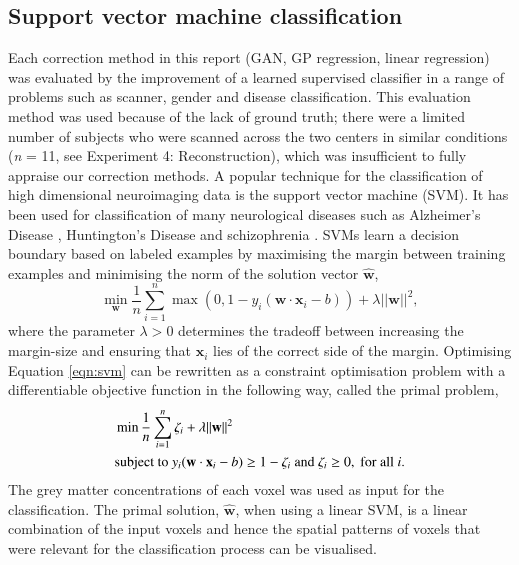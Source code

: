 \subsection{Support vector machine classification}
Each correction method in this report (GAN, GP regression, linear regression) was evaluated by the improvement of a learned supervised classifier in a range of problems such as scanner, gender and disease classification. This evaluation method was used because of the lack of ground truth; there were a limited number of subjects who were scanned across the two centers in similar conditions (\textit{n} = 11, see Experiment 4: Reconstruction), which was insufficient to fully appraise our correction methods. A popular technique for the classification of high dimensional neuroimaging data is the support vector machine (SVM). It has been used for classification of many neurological diseases such as Alzheimer's Disease \citep{magnin2009support, jongkreangkrai2016computer}, Huntington's Disease \citep{kostro2014correction} and schizophrenia \citep{winterburn2017can,davatzikos2005whole,koutsouleris2009use,zhang2014heterogeneity,kambeitz2015detecting}. SVMs learn a decision boundary based on labeled examples by maximising the margin between training examples and minimising the norm of the solution vector $\hat{\mathbf{w}}$,
\begin{equation}
	\min_\mathbf{w} \frac{1}{n}\sum_{i=1}^n \max (0,1-y_i(\mathbf{w}\cdot \mathbf{x}_i -b)) + \lambda ||\mathbf{w}||^2 ,
    \label{eqn:svm}
\end{equation}
where the parameter $\lambda>0$ determines the tradeoff between increasing the margin-size and ensuring that $\mathbf{x}_i$ lies of the correct side of the margin.
Optimising Equation \ref{eqn:svm} can be rewritten as a constraint optimisation problem with a differentiable objective function in the following way, called the primal problem,
\begin{align}
 \nonumber &\min \frac{1}{n}\sum_{i=1}^n \zeta_i +\lambda ||\mathbf{w}||^2 \\
 &\textnormal{subject to } y_i(\mathbf{w}\cdot\mathbf{x}_i-b) \geq 1-\zeta_i
 \textnormal{ and } \zeta_i \geq 0,\textnormal{ for all }  i.
\end{align}
The grey matter concentrations of each voxel was used as input for the classification. The primal solution, $\hat{\mathbf{w}}$, when using a linear SVM, is a linear combination of the input voxels and hence the spatial patterns of voxels that were relevant for the classification process can be visualised.

